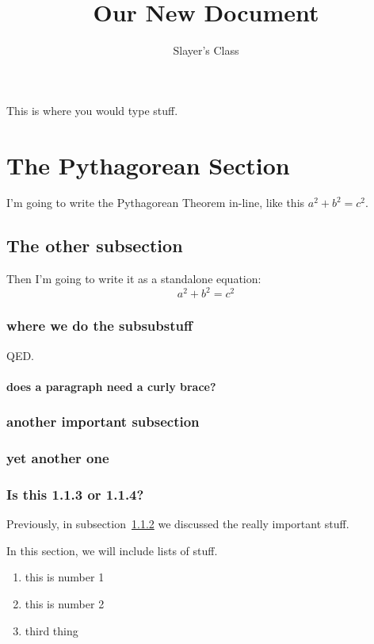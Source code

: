 \documentclass{article}
\author{Slayer's Class}
\title{Our New Document}
\begin{document}
\maketitle
This is where you would type stuff.

\section{The Pythagorean Section}
I'm going to write the Pythagorean Theorem in-line, like this $a^2+b^2=c^2$.

\subsection{The other subsection}
Then I'm going to write it as a standalone equation:
$$a^2+b^2=c^2$$

\subsubsection{where we do the subsubstuff}
QED.

\paragraph{does a paragraph need a curly brace?}

\subsubsection{another important subsection}\label{Sec:important}
\subsubsection*{yet another one}
\subsubsection{Is this 1.1.3 or 1.1.4?}

Previously, in subsection~\ref{Sec:important} we discussed the really important stuff.


In this section, we will include lists of stuff.

\begin{enumerate}
\item this is number 1
\item this is number 2
\item third thing
\end{enumerate}
\end{document}
